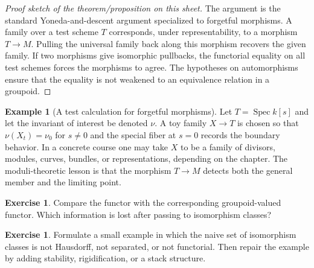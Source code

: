 \documentclass[11pt]{amsart}
\theoremstyle{definition}
\newtheorem{example}[theorem]{Example}
\newtheorem{exercise}[theorem]{Exercise}
\newcommand{\Spec}{\operatorname{Spec}}
\begin{document}
\begin{proof}[Proof sketch of the theorem/proposition on this sheet]
The argument is the standard Yoneda-and-descent argument specialized to forgetful morphisms.  A family over a test scheme $T$ corresponds, under representability, to a morphism $T\to M$.  Pulling the universal family back along this morphism recovers the given family.  If two morphisms give isomorphic pullbacks, the functorial equality on all test schemes forces the morphisms to agree.  The hypotheses on automorphisms ensure that the equality is not weakened to an equivalence relation in a groupoid.
\end{proof}
\begin{example}[A test calculation for forgetful morphisms]
Let $T=\Spec k[s]$ and let the invariant of interest be denoted $\nu$.  A toy family $X\to T$ is chosen so that $\nu(X_t)=\nu_0$ for $s\ne0$ and the special fiber at $s=0$ records the boundary behavior.  In a concrete course one may take $X$ to be a family of divisors, modules, curves, bundles, or representations, depending on the chapter.  The moduli-theoretic lesson is that the morphism $T\to M$ detects both the general member and the limiting point.
\end{example}
\begin{exercise}
Compare the functor with the corresponding groupoid-valued functor.  Which information is lost after passing to isomorphism classes?
\end{exercise}
\begin{exercise}
Formulate a small example in which the naive set of isomorphism classes is not Hausdorff, not separated, or not functorial.  Then repair the example by adding stability, rigidification, or a stack structure.
\end{exercise}
\clearpage
\end{document}
